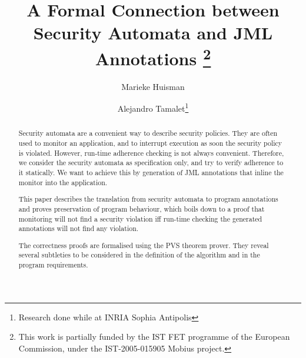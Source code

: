 \documentclass[]{llncs}
\title{A Formal Connection between Security Automata and JML Annotations
\thanks{This work is partially funded by the IST FET
programme of the European Commission, under the IST-2005-015905
\textsf{Mobius} project.}}
\author{Marieke Huisman\inst{1} \and Alejandro Tamalet\inst{2}\thanks{Research done while at INRIA Sophia Antipolis}}
\institute{INRIA Sophia Antipolis, France \and
University of Nijmegen, Netherlands}
\begin{document}
\maketitle
\begin{abstract}
Security automata are a convenient way to describe security
policies. They are often used to monitor an application, and to
interrupt execution as soon the security policy is violated. However,
run-time adherence checking is not always convenient.
Therefore, we consider the security automata as specification only,
and try to verify adherence to it statically. We want to achieve this by
generation of JML annotations that inline the monitor into the application.

%
This paper describes the translation from security automata to program
annotations and proves preservation of program behaviour, which
boils down to a proof
that monitoring will not find a security violation iff run-time
checking the generated annotations will not find any violation.

%
%
The correctness proofs are formalised using the PVS theorem prover.
They reveal several subtleties to be considered in the definition of the
algorithm and in the program requirements.
\end{abstract}










%

\end{document}
